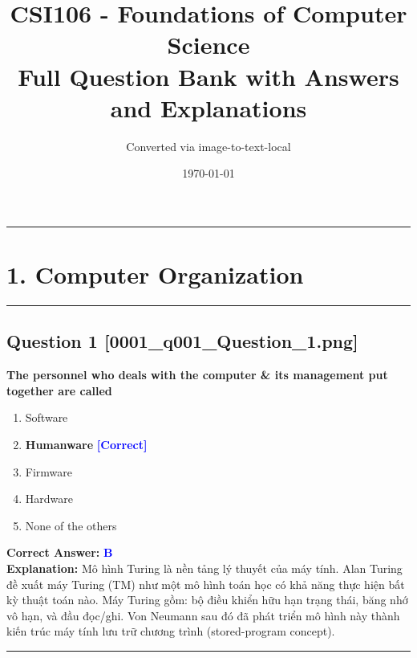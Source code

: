 \documentclass[11pt,a4paper]{article}
\title{\textbf{CSI106 - Foundations of Computer Science}\\\Large Full Question Bank with Answers and Explanations}
\author{Converted via image-to-text-local}
\date{\today}
\begin{document}
\maketitle
\tableofcontents

\vspace{0.8cm}
\hrule
\vspace{0.5cm}


\newpage
\section*{1. Computer Organization}
\hrule\vspace{0.5cm}

\begin{minipage}{\textwidth}
\subsection*{Question 1 \quad \footnotesize{[0001\_q001\_Question\_1.png]}}
\noindent \textbf{The personnel who deals with the computer \& its management put together are called}

\begin{enumerate}[label=\Alph*.]
    \item Software
    \item \textbf{Humanware} \hfill \textcolor{blue}{\textbf{[Correct]}}
    \item Firmware
    \item Hardware
    \item None of the others
\end{enumerate}

\noindent \textbf{Correct Answer:} \textcolor{blue}{\textbf{B}} \\[2pt]
\noindent \textbf{Explanation:} Mô hình Turing là nền tảng lý thuyết của máy tính. Alan Turing đề xuất máy Turing (TM) như một mô hình toán học có khả năng thực hiện bất kỳ thuật toán nào. Máy Turing gồm: bộ điều khiển hữu hạn trạng thái, băng nhớ vô hạn, và đầu đọc/ghi. Von Neumann sau đó đã phát triển mô hình này thành kiến trúc máy tính lưu trữ chương trình (stored-program concept).

\par\vspace{0.3cm}
\hrule
\vspace{0.3cm}
\end{minipage}
\end{document}
